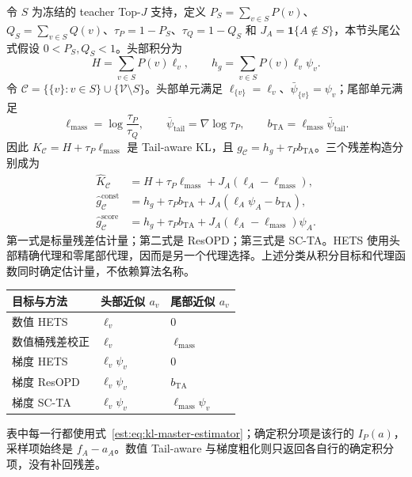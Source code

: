 \documentclass[lang=cn,scheme=chinese,openany]{../book/elegantbook}
\newcommand{\tail}{\mathrm{tail}}
\begin{document}
令 $S$ 为冻结的 teacher Top-$J$ 支持，定义 $P_S=\sum_{v\in S}P(v)$、$Q_S=\sum_{v\in S}Q(v)$、$\tau_P=1-P_S$、$\tau_Q=1-Q_S$ 和 $J_A=\mathbf1\{A\notin S\}$，本节头尾公式假设 $0<P_S,Q_S<1$。头部积分为
\begin{equation*}
 H=\sum_{v\in S}P(v)\ell_v,\qquad h_g=\sum_{v\in S}P(v)\ell_v\psi_v.
\end{equation*}
令 $\mathcal C=\{\{v\}:v\in S\}\cup\{\mathcal V\setminus S\}$。头部单元满足 $\ell_{\{v\}}=\ell_v$、$\bar\psi_{\{v\}}=\psi_v$；尾部单元满足
\begin{equation*}
 \ell_{\mathrm{mass}}=\log\frac{\tau_P}{\tau_Q},\qquad
 \bar \psi_\tail=\nabla\log\tau_P,\qquad
 b_{\mathrm{TA}}=\ell_{\mathrm{mass}}\bar \psi_\tail.
\end{equation*}
因此 $K_{\mathcal C}=H+\tau_P\ell_{\mathrm{mass}}$ 是 Tail-aware KL，且 $g_{\mathcal C}=h_g+\tau_Pb_{\mathrm{TA}}$。三个残差构造分别成为
\begin{align*}
 \widehat K_{\mathcal C}
 &=H+\tau_P\ell_{\mathrm{mass}}+J_A(\ell_A-\ell_{\mathrm{mass}}),\\
 \widehat g_{\mathcal C}^{\mathrm{const}}
 &=h_g+\tau_Pb_{\mathrm{TA}}+J_A(\ell_A\psi_A-b_{\mathrm{TA}}),\\
 \widehat g_{\mathcal C}^{\mathrm{score}}
 &=h_g+\tau_Pb_{\mathrm{TA}}+J_A(\ell_A-\ell_{\mathrm{mass}})\psi_A.
\end{align*}
第一式是标量残差估计量；第二式是 ResOPD；第三式是 SC-TA。HETS 使用头部精确代理和零尾部代理，因而是另一个代理选择。上述分类从积分目标和代理函数同时确定估计量，不依赖算法名称。

\begin{center}
\begin{tabular}{lll}
\toprule
目标与方法 & 头部近似 $a_v$ & 尾部近似 $a_v$\\
\midrule
数值 HETS & $\ell_v$ & $0$\\
数值桶残差校正 & $\ell_v$ & $\ell_{\mathrm{mass}}$\\
梯度 HETS & $\ell_v\psi_v$ & $0$\\
梯度 ResOPD & $\ell_v\psi_v$ & $b_{\mathrm{TA}}$\\
梯度 SC-TA & $\ell_v\psi_v$ & $\ell_{\mathrm{mass}}\psi_v$\\
\bottomrule
\end{tabular}
\end{center}
表中每一行都使用式~\eqref{est:eq:kl-master-estimator}；确定积分项是该行的 $I_P(a)$，采样项始终是 $f_A-a_A$。数值 Tail-aware 与梯度粗化则只返回各自行的确定积分项，没有补回残差。
\end{document}
